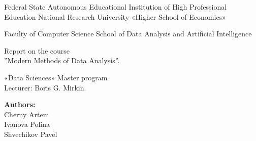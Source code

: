 \documentclass{article}\usepackage[]{graphicx}\usepackage[]{color}
\begin{document}
\begin{center}
Federal State Autonomous Educational Institution
of High Professional Education
National Research University «Higher School of Economics»
\end{center}

\begin{center}
Faculty of Computer Science
School of Data Analysis and Artificial Intelligence
\end{center}

\vspace*{3 cm}

\begin{center} \huge
Report on the course \\ 
''Modern Methods of Data Analysis''.
\end{center}


\vspace*{1.5 cm}

\begin{center} \large
«Data Sciences» Master program \\
Lecturer: Boris G. Mirkin.
\end{center}


\begin{center} \large
\textbf{Authors:}\\
Cherny Artem \\
Ivanova Polina \\
Shvechikov Pavel \\
\end{center}
 


\newpage


\clearpage


\clearpage




\end{document}
